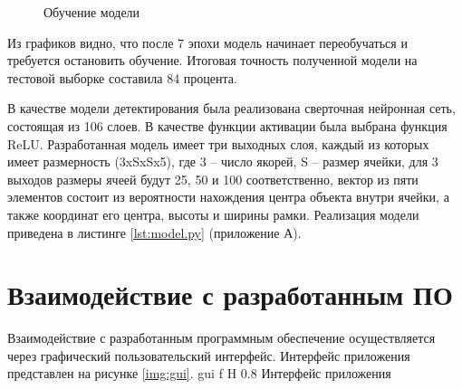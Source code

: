 \begin{figure}[H]
	\begin{center}
		\caption{Обучение модели}
		\label{img:model_training}
	\end{center}
\end{figure}

Из графиков видно, что после 7 эпохи модель начинает переобучаться и требуется остановить обучение. Итоговая точность полученной модели на тестовой выборке составила 84 процента.

В качестве модели детектирования была реализована сверточная нейронная сеть, состоящая из 106 слоев. В качестве функции активации была выбрана функция ReLU. Разработанная модель имеет три выходных слоя, каждый из которых имеет размерность (3xSxSx5), где 3 -- число якорей, S -- размер ячейки, для 3 выходов размеры ячеей будут 25, 50 и 100 соответственно, вектор из пяти элементов состоит из вероятности нахождения центра объекта внутри ячейки, а также координат его центра, высоты и ширины рамки. Реализация модели приведена в листинге \ref{lst:model.py} (приложение А).


\section{Взаимодействие с разработанным ПО}

Взаимодействие с разработанным программным обеспечение осуществляется через графический пользовательский интерфейс. Интерфейс приложения представлен на рисунке \ref{img:gui}.
{gui} %
{f} %
{H} %
{0.8\textwidth} %
{Интерфейс приложения} %

